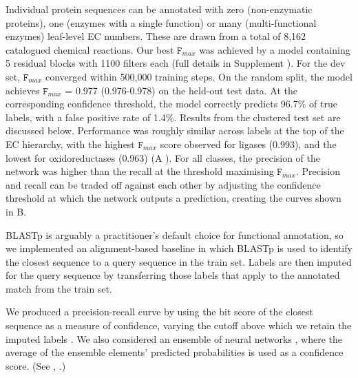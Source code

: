 Individual protein sequences can be annotated with zero (non-enzymatic proteins), one (enzymes with a single function) or many (multi-functional enzymes) leaf-level EC numbers. These are drawn from a total of 8,162 catalogued chemical reactions.
Our best $\texttt{F}_{max}$ was achieved by a model containing 5 residual blocks with 1100 filters each (full details in \textnormal{ Supplement}%
). For the dev set, $\texttt{F}_{max}$ converged within 500,000 training steps. On the random split, the model achieves $\texttt{F}_{max}$ = 0.977 (0.976-0.978) on the held-out test data. At the corresponding confidence threshold, the model correctly predicts 96.7\% of true labels, with a false positive rate of 1.4\%. Results from the clustered test set are discussed below.
Performance was roughly similar across labels at the top of the EC hierarchy, with the highest $\texttt{F}_{max}$ score observed for ligases (0.993), and the lowest for oxidoreductases (0.963) (A%
). For all classes, the precision of the network was higher than the recall at the threshold maximising $\texttt{F}_{max}$. Precision and recall can be traded off against each other by adjusting the confidence threshold at which the network outputs a prediction, creating the curves shown in B.%

BLASTp is arguably a practitioner's default choice for functional annotation, so we implemented an alignment-based baseline in which BLASTp is used to identify the closest sequence to a query sequence in the train set. Labels are then imputed for the query sequence by transferring those labels that apply to the annotated match from the train set.

We produced a precision-recall curve by using the bit score of the closest sequence as a measure of confidence, varying the cutoff above which we retain the imputed labels \cite{zhou2019cafa, eddy2011accelerated}. We also considered an ensemble of neural networks \cite{bileschi}, where the average of the ensemble elements' predicted probabilities is used as a confidence score. %
(See , .)

